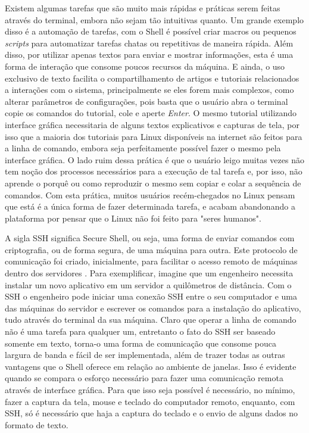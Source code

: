 Existem algumas tarefas que são muito mais rápidas e práticas serem feitas através do terminal, embora não sejam tão intuitivas quanto. Um grande exemplo disso é a automação de tarefas, com o Shell é possível criar macros ou pequenos \emph{scripts} para automatizar tarefas chatas ou repetitivas de maneira rápida. Além disso, por utilizar apenas textos para enviar e mostrar informações, esta é uma forma de interação que consome poucos recursos da máquina. E ainda, o uso exclusivo de texto facilita o compartilhamento de artigos e tutoriais relacionados a interações com o sistema, principalmente se eles forem mais complexos, como alterar parâmetros de configurações, pois basta que o usuário abra o terminal copie os comandos do tutorial, cole e aperte \emph{Enter}. O mesmo tutorial utilizando interface gráfica necessitaria de alguns textos explicativos e capturas de tela, por isso que a maioria dos tutoriais para Linux disponíveis na internet são feitos para a linha de comando, embora seja perfeitamente possível fazer o mesmo pela interface gráfica. O lado ruim dessa prática é que o usuário leigo muitas vezes não tem noção dos processos necessários para a execução de tal tarefa e, por isso, não aprende o porquê ou como reproduzir o mesmo sem copiar e colar a sequência de comandos. Com esta prática, muitos usuários recém-chegados no Linux pensam que está é a única forma de fazer determinada tarefa, e acabam abandonando a plataforma por pensar que o Linux não foi feito para "seres humanos".

A sigla SSH significa Secure Shell, ou seja, uma forma de enviar comandos com criptografia, ou de forma segura, de uma máquina para outra. Este protocolo de comunicação foi criado, inicialmente, para facilitar o acesso remoto de máquinas dentro dos servidores \cite{derekbbb}. Para exemplificar, imagine que um engenheiro necessita instalar um novo aplicativo em um servidor a quilômetros de distância. Com o SSH o engenheiro pode iniciar uma conexão SSH entre o seu computador e uma das máquinas do servidor e escrever os comandos para a instalação do aplicativo, tudo através do terminal da sua máquina. Claro que operar a linha de comando não é uma tarefa para qualquer um, entretanto o fato do SSH ser baseado somente em texto, torna-o uma forma de comunicação que consome pouca largura de banda e fácil de ser implementada, além de trazer todas as outras vantagens que o Shell oferece em relação ao ambiente de janelas. Isso é evidente quando se compara o esforço necessário para fazer uma comunicação remota através de interface gráfica. Para que isso seja possível é necessário, no mínimo, fazer a captura da tela, mouse e teclado do computador remoto, enquanto, com SSH, só é necessário que haja a captura do teclado e o envio de alguns dados no formato de texto.

